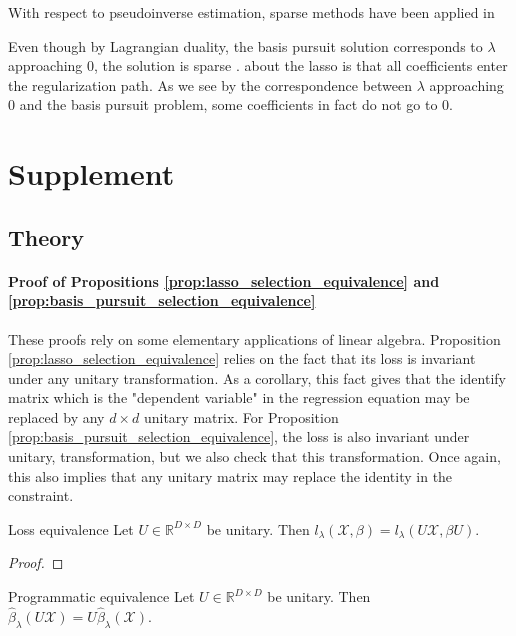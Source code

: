 \documentclass[a4paper,11pt]{article}
\begin{document}
With respect to pseudoinverse estimation, sparse methods have been applied in \cite{Sun2012-vp}

Even though by Lagrangian duality, the basis pursuit solution corresponds to $\lambda$ approaching $0$, the solution is sparse \cite{Tropp04-ju}.
about the lasso is that all coefficients enter the regularization path.
As we see by the correspondence between $\lambda$ approaching $0$ and the basis pursuit problem, some coefficients in fact do not go to $0$. 
\section{Supplement}

\subsection{Theory}

\paragraph{Proof of Propositions \ref{prop:lasso_selection_equivalence} and \ref{prop:basis_pursuit_selection_equivalence}}

These proofs rely on some elementary applications of linear algebra.
Proposition \ref{prop:lasso_selection_equivalence} relies on the fact that its loss is invariant under any unitary transformation.
As a corollary, this fact gives that the identify matrix which is the "dependent variable" in the regression equation may be replaced by any $d \times d$ unitary matrix.
For Proposition \ref{prop:basis_pursuit_selection_equivalence}, the loss is also invariant under unitary, transformation, but we also check that this transformation.
Once again, this also implies that any unitary matrix may replace the identity in the constraint.


 \begin{proposition}{Loss equivalence}
 \label{prop:lasso_loss_equivalence}
 Let $U \in \mathbb R^{D \times D}$ be unitary.
 Then $l_\lambda (\mathcal X, \beta) = l_\lambda (U \mathcal X, \beta U)$.
\end{proposition}

\begin{proof}

\end{proof}

\begin{proposition}{Programmatic equivalence}
\label{prop:lasso_program_equivalence}
 Let $U \in \mathbb R^{D \times D}$ be unitary.
 Then $\hat \beta_{\lambda}  (U \mathcal X) = U\hat \beta_{\lambda} (\mathcal X)$.
\end{proposition}
\end{document}
